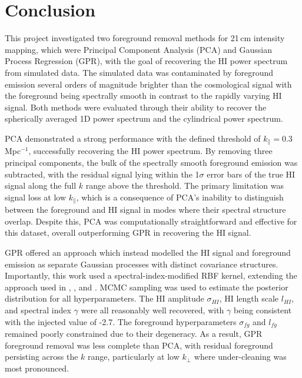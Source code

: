 \section{Conclusion}
\label{sec:conclusion}

This project investigated two foreground removal methods for 21\,cm intensity mapping, which were Principal Component Analysis (PCA) and Gaussian Process Regression (GPR), with the goal of recovering the HI power spectrum from simulated data. The simulated data was contaminated by foreground emission several orders of magnitude brighter than the cosmological signal with the foreground being spectrally smooth in contrast to the rapidly varying HI signal. Both methods were evaluated through their ability to recover the spherically averaged 1D power spectrum and the cylindrical power spectrum.

PCA demonstrated a strong performance with the defined threshold of $k_{\parallel} = 0.3$\,Mpc$^{-1}$, successfully recovering the HI power spectrum. By removing three principal components, the bulk of the spectrally smooth foreground emission was subtracted, with the residual signal lying within the 1$\sigma$ error bars of the true HI signal along the full $k$ range above the threshold. The primary limitation was signal loss at low $k_{\parallel}$, which is a consequence of PCA's inability to distinguish between the foreground and HI signal in modes where their spectral structure overlap. Despite this, PCA was computationally straightforward and effective for this dataset, overall outperforming GPR in recovering the HI signal. 

GPR offered an approach which instead modelled the HI signal and foreground emission as separate Gaussian processes with distinct covariance structures. Importantly, this work used a spectral-index-modified RBF kernel, extending the approach used in \cite{kernGaussianProcessForeground2020}, \cite{mertensImprovedUpperLimits2020}, and \cite{soaresGaussianProcessRegression2022}. MCMC sampling was used to estimate the posterior distribution for all hyperparameters. The HI amplitude $\sigma_{HI}$, HI length scale $l_{HI}$, and spectral index $\gamma$ were all reasonably well recovered, with $\gamma$ being consistent with the injected value of -2.7. The foreground hyperparameters $\sigma_{fg}$ and $l_{fg}$ remained poorly constrained due to their degeneracy. As a result, GPR foreground removal was less complete than PCA, with residual foreground persisting across the $k$ range, particularly at low $k_{\perp}$ where under-cleaning was most pronounced.

